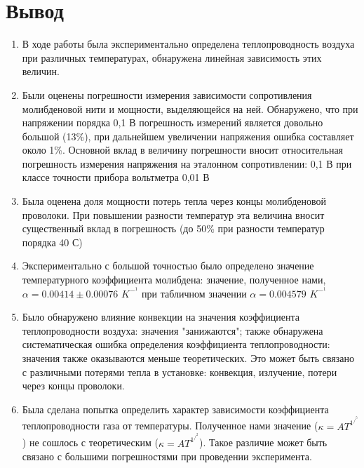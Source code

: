 \documentclass{article}
\begin{document}
    \section{Вывод}
    
    \begin{enumerate}

        \item В ходе работы была экспериментально определена теплопроводность воздуха при различных температурах, обнаружена линейная зависимость этих величин.
        \item Были оценены погрешности измерения зависимости сопротивления молибденовой нити и мощности, выделяющейся на ней. Обнаружено, что при напряжении порядка 0,1 В погрешность измерений является довольно большой (13\%), при дальнейшем увеличении напряжения ошибка составляет около 1\%. Основной вклад в величину погрешности вносит относительная погрешность измерения напряжения на эталонном сопротивлении: 0,1 В при классе точности прибора вольтметра 0,01 В
        \item Была оценена доля мощности потерь тепла через концы молибденовой проволоки. При повышении разности температур эта величина вносит существенный вклад в погрешность (до 50\% при разности температур порядка 40 С)
        \item Экспериментально с большой точностью было определено значение температурного коэффициента молибдена: значение, полученное нами, $\alpha = 0.00414 \pm 0.00076$ $K^-^1 $ при табличном значении  $\alpha = 0.004579 $ $K^-^1 $
        \item Было обнаружено влияние конвекции на значения коэффициента теплопроводности воздуха: значения "занижаются"; также обнаружена систематическая ошибка определения коэффициента теплопроводности: значения также оказываются меньше теоретических. Это может быть связано с различными потерями тепла в установке: конвекция, излучение, потери через концы проволоки.
        \item Была сделана попытка определить характер зависимости коэффициента теплопроводности газа от температуры. Полученное нами значение ($\kappa = AT^1^/^5 $) не сошлось с теоретическим ($\kappa = AT^1^/^2 $). Такое различие может быть связано с большими погрешностями при проведении эксперимента.
 \end{enumerate}

    
    
    
\end{document}
